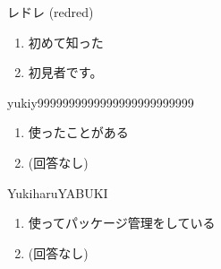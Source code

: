 \begin{prework}{ レドレ (redred) }
  \begin{enumerate}
  \item 初めて知った
  \item 初見者です。
  \end{enumerate}
\end{prework}

\begin{prework}{ yukiy9999999999999999999999999 }
  \begin{enumerate}
  \item 使ったことがある
  \item (回答なし)
  \end{enumerate}
\end{prework}

\begin{prework}{ YukiharuYABUKI }
  \begin{enumerate}
  \item 使ってパッケージ管理をしている
  \item (回答なし)
  \end{enumerate}
\end{prework}

